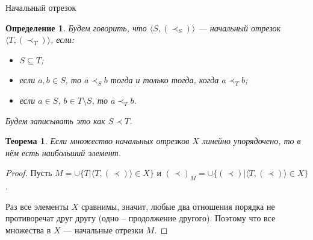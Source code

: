 \documentclass[aspectratio=169]{beamer}
\newtheorem{thm}{Теорема}[section]
\newtheorem{dfn}{Определение}[section]
\begin{document}
\begin{frame}{Начальный отрезок}

\begin{dfn}Будем говорить, что $\langle S, (\prec_S)\rangle$ --- начальный отрезок $\langle T, (\prec_T) \rangle$,
если:\begin{itemize}
\item $S \subseteq T$;
\item если $a,b \in S$, то $a \prec_S b$ тогда и только тогда, когда $a \prec_T b$;
\item если $a \in S$, $b \in T\setminus S$, то $a \prec_T b$.
\end{itemize}

Будем записывать это как $S \prec T$.
\end{dfn}

\begin{thm}Если множество начальных отрезков $X$ линейно упорядочено, то в нём есть наибольший элемент.
\end{thm}

\begin{proof}Пусть $M = \cup \{ T | \langle T, (\prec) \rangle \in X \}$ и
$(\prec)_M = \cup \{ (\prec) | \langle T, (\prec) \rangle \in X \}$.

Раз все элементы $X$ сравнимы, значит, любые два отношения порядка не противоречат друг другу
(одно -- продолжение другого). Поэтому что все множества в $X$ --- начальные отрезки $M$. 
\end{proof}

\end{frame}
\end{document}
